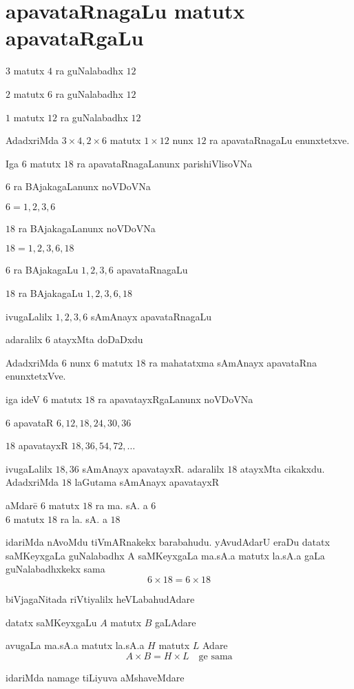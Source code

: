 \chapter{apavataRnagaLu matutx apavataRgaLu}


$3$ matutx $4$ ra guNalabadhx $12$

$2$ matutx $6$ ra guNalabadhx $12$

$1$ matutx $12$ ra guNalabadhx $12$

AdadxriMda $3\times4, 2\times 6 $ matutx $1\times 12$ nunx $12$ ra apavataRnagaLu enunxtetxve.

Iga $6$ matutx $18$ ra apavataRnagaLanunx parishiVlisoVNa 

$6$ ra BAjakagaLanunx noVDoVNa

$6=1,2,3,6$ 

$18$ ra BAjakagaLanunx noVDoVNa

$18=1,2,3,6,18$

$6$ ra BAjakagaLu $1,2,3,6$ \qquad apavataRnagaLu

$18$ ra BAjakagaLu $1,2,3,6,18$

ivugaLalilx $1,2,3,6$ sAmAnayx apavataRnagaLu 

adaralilx $6$ atayxMta doDaDxdu

AdadxriMda $6$ nunx $6$ matutx $18$ ra mahatatxma sAmAnayx apavataRna enunxtetxVve. 

iga ideV $6$ matutx $18$ ra apavatayxRgaLanunx noVDoVNa 

$6$ apavataR $6,12,18,24,30,36$

$18$ apavatayxR $18,36,54,72,\ldots$

ivugaLalilx $18, 36$ sAmAnayx apavatayxR. adaralilx $18$ atayxMta cikakxdu. AdadxriMda $18$ laGutama sAmAnayx apavatayxR
\begin{tabbing}
aMdare\qquad \= $6$ matutx $18$ ra ma. sA. a $6$\\
\> $6$ matutx $18$ ra la. sA. a $18$
\end{tabbing}
idariMda nAvoMdu tiVmARnakekx barabahudu. yAvudAdarU eraDu datatx saMKeyxgaLa guNalabadhx A saMKeyxgaLa ma.sA.a matutx la.sA.a gaLa guNalabadhxkekx sama
$$
6\times 18 = 6 \times 18
$$

biVjagaNitada riVtiyalilx heVLabahudAdare

datatx saMKeyxgaLu $A$ matutx $B$ gaLAdare

avugaLa ma.sA.a matutx la.sA.a  $H$ matutx $L$ Adare
$$
A\times B = H\times L \quad \text{ge sama}
$$

idariMda namage tiLiyuva aMshaveMdare

